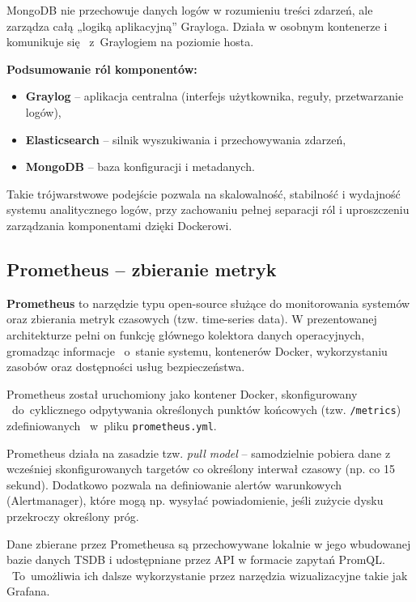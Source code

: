 \documentclass[
    left=2.5cm,         %
    right=2.5cm,        %
    top=2.5cm,          %
    bottom=3cm,         %
    bindingoffset=6mm,  %
    nohyphenation=true %
]{eiti/eiti-thesis} %
\begin{document}
MongoDB nie przechowuje danych logów w rozumieniu treści zdarzeń, ale zarządza całą „logiką aplikacyjną” Grayloga. Działa w osobnym kontenerze i komunikuje 
się ~z~Graylogiem na poziomie hosta.

\textbf{Podsumowanie ról komponentów:}
\begin{itemize}
    \item \textbf{Graylog} – aplikacja centralna (interfejs użytkownika, reguły, przetwarzanie logów),
    \item \textbf{Elasticsearch} – silnik wyszukiwania i przechowywania zdarzeń,
    \item \textbf{MongoDB} – baza konfiguracji i metadanych.
\end{itemize}

Takie trójwarstwowe podejście pozwala na skalowalność, stabilność i wydajność systemu analitycznego logów, przy zachowaniu pełnej separacji ról i uproszczeniu zarządzania komponentami dzięki Dockerowi.

\subsection{Prometheus – zbieranie metryk}

\textbf{Prometheus}\cite{prometheus-docs} to narzędzie typu open-source służące do monitorowania systemów oraz zbierania metryk czasowych (tzw. time-series data). 
W prezentowanej architekturze pełni on funkcję głównego kolektora danych operacyjnych, gromadząc informacje ~o~stanie systemu, kontenerów Docker, wykorzystaniu zasobów oraz dostępności usług bezpieczeństwa.

Prometheus został uruchomiony jako kontener Docker, skonfigurowany ~do~cyklicznego odpytywania określonych punktów końcowych (tzw. \texttt{/metrics}) zdefiniowanych 
~w~pliku \texttt{prometheus.yml}\cite{config-prometheus}. 

Prometheus działa na zasadzie tzw. \textit{pull model} – samodzielnie pobiera dane z wcześniej skonfigurowanych targetów co określony interwał czasowy (np. co 15 sekund). Dodatkowo pozwala na definiowanie alertów warunkowych (Alertmanager), które mogą np. wysyłać powiadomienie, jeśli zużycie dysku przekroczy określony próg.

Dane zbierane przez Prometheusa są przechowywane lokalnie w jego wbudowanej bazie danych TSDB\cite{prometheus_storage} i udostępniane przez API w formacie zapytań PromQL\cite{prometheus_querying}. ~To~umożliwia ich dalsze wykorzystanie przez narzędzia wizualizacyjne takie jak Grafana.
\end{document}
